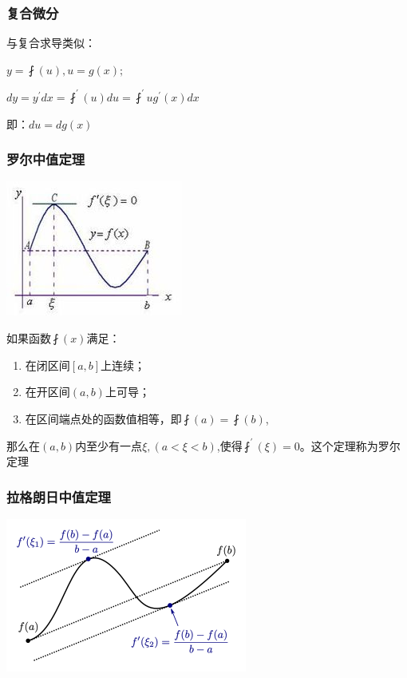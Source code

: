 \documentclass[UTF8]{ctexbook}
\newcommand{\derivative}{^\prime}
\begin{document}
{{{\subsubsection{复合微分}{
  与复合求导类似：

  $y = \fint(u), u = g(x);$

  $dy = y\derivative dx = \fint\derivative(u)du = \fint\derivative{u}g\derivative(x)dx$

  即：$du = dg(x)$
}%

\subsubsection{罗尔中值定理}{
  \includegraphics{resources/Rolle's_mean_value_theorem.jpg}

  如果函数$\fint(x)$满足：

  \begin{enumerate}
    \item 在闭区间$[a,b]$上连续；
    \item 在开区间$(a,b)$上可导；
    \item 在区间端点处的函数值相等，即$\fint(a) = \fint(b)$,
  \end{enumerate}

  那么在$(a,b)$内至少有一点$\xi, (a<\xi<b)$,使得$\fint\derivative(\xi) = 0$。这个定理称为罗尔定理
}%

\subsubsection{拉格朗日中值定理}{
\includegraphics{resources/Lagrange's_mean_value_theorem.png}

}}}}
\end{document}
